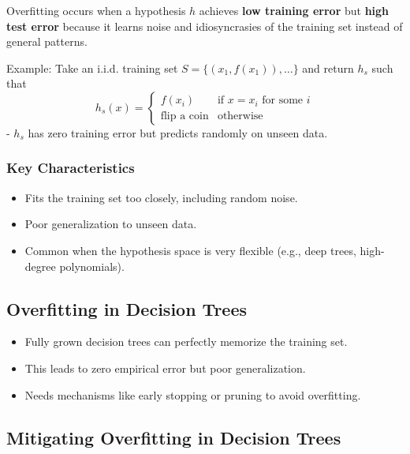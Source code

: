 Overfitting occurs when a hypothesis $h$ achieves \textbf{low training error} but \textbf{high test error} because it learns noise and idiosyncrasies of the training set instead of general patterns.

Example:
Take an i.i.d. training set $S = \{(x_1, f(x_1)), \dots\}$ and return $h_s$ such that 
$$h_s(x) = \begin{cases} f(x_i) & \text{if } x = x_i \text{ for some }i \\ \text{flip a coin} & \text{otherwise} \end{cases}$$
- $h_s$ has zero training error but predicts randomly on unseen data.

\subsubsection*{Key Characteristics}
\begin{itemize}
    \item Fits the training set too closely, including random noise.
    \item Poor generalization to unseen data.
    \item Common when the hypothesis space is very flexible (e.g., deep trees, high-degree polynomials).
\end{itemize}

\subsection*{Overfitting in Decision Trees}
\begin{itemize}
    \item Fully grown decision trees can perfectly memorize the training set.
    \item This leads to zero empirical error but poor generalization.
    \item Needs mechanisms like early stopping or pruning to avoid overfitting.
\end{itemize}

\subsection*{Mitigating Overfitting in Decision Trees}

